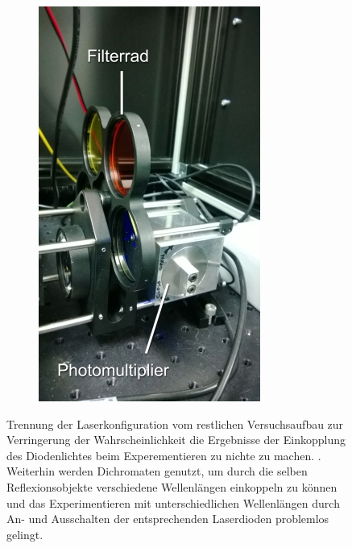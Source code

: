 \begin{figure}
\begin{subfigure}[b]{0.5\linewidth}
\end{subfigure}
\begin{subfigure}[b]{0.5\linewidth}
\includegraphics[width=0.98\linewidth]{IMAGE/pmt.png}\label{fig:pmt}
\end{subfigure}

\caption{Trennung der Laserkonfiguration vom restlichen Versuchsaufbau zur Verringerung der Wahrscheinlichkeit die Ergebnisse der Einkopplung des Diodenlichtes beim Experementieren zu nichte zu machen. \cite{Anleitung}.
	Weiterhin werden Dichromaten genutzt, um durch die selben Reflexionsobjekte verschiedene Wellenlängen einkoppeln zu können und das Experimentieren mit unterschiedlichen Wellenlängen durch An- und Ausschalten der entsprechenden Laserdioden problemlos gelingt. \\}
\end{figure}
